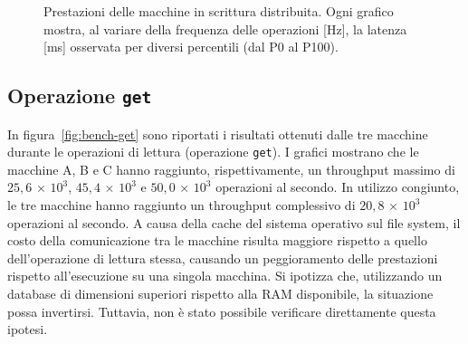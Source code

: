 \begin{figure}[htbp]
    \caption{Prestazioni delle macchine in scrittura distribuita. Ogni grafico mostra, al variare della frequenza delle operazioni [Hz], la latenza [ms] osservata per diversi percentili (dal P0 al P100).}
    \label{fig:bench-set-all}
\end{figure}

\subsection{Operazione \texttt{get}}
\label{subsec:risultati-get}

In figura~\ref{fig:bench-get} sono riportati i risultati ottenuti dalle tre macchine durante le operazioni di lettura (operazione \texttt{get}).
I grafici mostrano che le macchine A, B e C hanno raggiunto, rispettivamente, un throughput massimo di $25{,}6\,{\times}\,10^3$, $45{,}4\,{\times}\,10^3$ e $50{,}0\,{\times}\,10^3$ operazioni al secondo.
In utilizzo congiunto, le tre macchine hanno raggiunto un throughput complessivo di $20{,}8\,{\times}\,10^3$ operazioni al secondo.
A causa della cache del sistema operativo sul file system, il costo della comunicazione tra le macchine risulta maggiore rispetto a quello dell'operazione di lettura stessa, causando un peggioramento delle prestazioni rispetto all'esecuzione su una singola macchina.
Si ipotizza che, utilizzando un database di dimensioni superiori rispetto alla RAM disponibile, la situazione possa invertirsi. Tuttavia, non è stato possibile verificare direttamente questa ipotesi.


